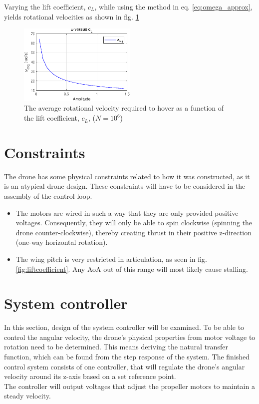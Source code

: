 Varying the lift coefficient, $c_L$, while using the method in eq. \ref{eq:omega_approx}, yields rotational velocities as shown in fig. \ref{fig:liftvariation}

\begin{figure}[h!]
    \centering
    \includegraphics[width=0.5\textwidth]{figures/control_loops/omega_lift_approximation.eps}
    \caption{The average rotational velocity required to hover as a function of the lift coefficient, $c_L$, ($N=10^6$)}
    \label{fig:liftvariation}
\end{figure}

\section{Constraints}
The drone has some physical constraints related to how it was constructed, as it is an atypical drone design. These constraints will have to be considered in the assembly of the control loop.
\begin{itemize}
\label{list:constraints}
    \item The motors are wired in such a way that they are only provided positive voltages. Consequently, they will only be able to spin clockwise (spinning the drone counter-clockwise), thereby creating thrust in their positive z-direction (one-way horizontal rotation).
    \item The wing pitch is very restricted in articulation, as seen in fig. \ref{fig:liftcoefficient}. Any AoA out of this range will most likely cause stalling.
\end{itemize}

\section{System controller}
In this section, design of the system controller will be examined. To be able to control the angular velocity, the drone's physical properties from motor voltage to rotation need to be determined. This means deriving the natural transfer function, which can be found from the step response of the system. 
The finished control system consists of one controller, that will regulate the drone's angular velocity around its z-axis based on a set reference point. \\
The controller will output voltages that adjust the propeller motors to maintain a steady velocity.


